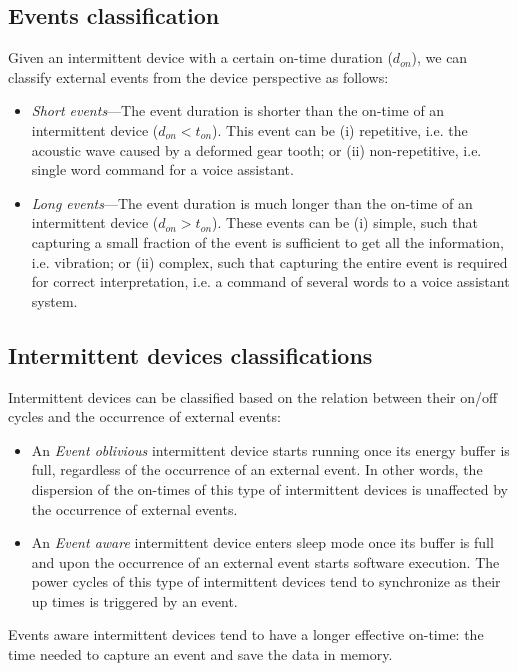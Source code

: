 \subsection{Events classification}

Given an intermittent device with a certain on-time duration ($d_{on}$), we can classify external events from the device perspective as follows:
\begin{itemize}
		\item \textit{Short events}---The event duration is shorter than the on-time of an intermittent device ($d_{on} < t_{on}$). This event can be (i) repetitive, i.e. the acoustic wave caused by a deformed gear tooth; or (ii) non-repetitive, i.e. single word command for a voice assistant.  

		\item \textit{Long events}---The event duration is much longer than the on-time of an intermittent device ($d_{on} > t_{on} $). These events can be (i) simple, such that capturing a small fraction of the event is sufficient to get all the information, i.e. vibration; or (ii) complex, such that capturing the entire event is required for correct interpretation, i.e. a command of several words to a voice assistant system. 
\end{itemize}

\subsection{Intermittent devices classifications}
Intermittent devices can be classified based on the relation between their on/off cycles and the occurrence of external events:  
\begin{itemize}
		\item An \textit{Event oblivious} intermittent device starts running once its energy buffer is full, regardless of the occurrence of an external event. In other words, the dispersion of the on-times of this type of intermittent devices is unaffected by the occurrence of external events. 
		\item An \textit{Event aware} intermittent device enters sleep mode once its buffer is full and upon the occurrence of an external event starts software execution. The power cycles of this type of intermittent devices tend to synchronize as their up times is triggered by an event.  

\end{itemize}

Events aware intermittent devices tend to have a longer effective on-time: the time needed to capture an event and save the data in memory.
%
%

